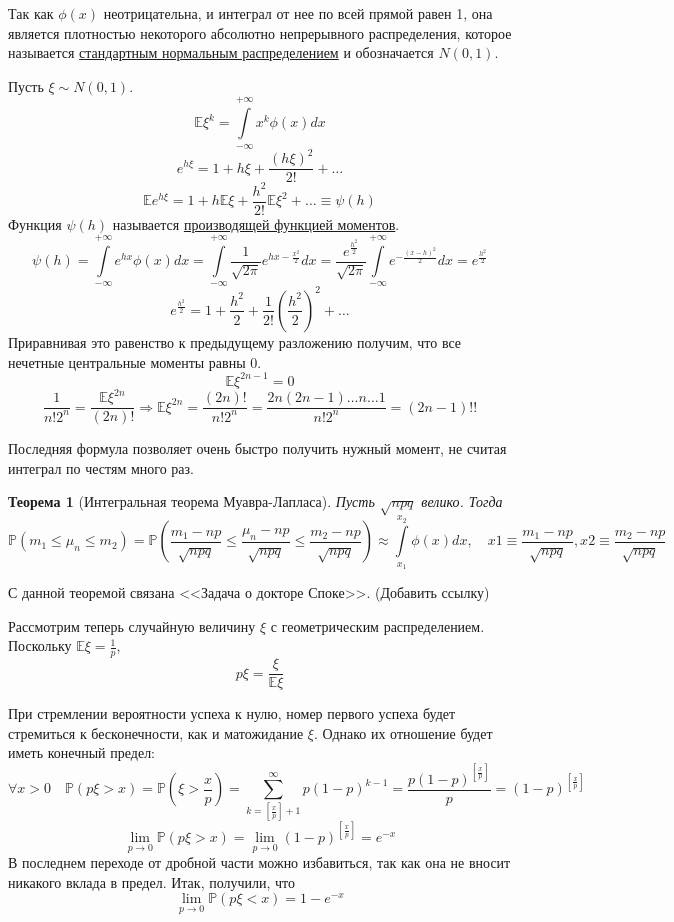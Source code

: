 \documentclass[12pt]{article}
\newtheorem{Th}{Теорема}
\numberwithin{Th}{section}
\numberwithin{Def}{section}
\numberwithin{Lem}{section}
\numberwithin{St}{section}
\numberwithin{equation}{section}
\newcommand\Sum[3]{\sum\limits_{#1 = #2}^{#3}}
\newcommand\Pro{\mathbb{P}} %
\newcommand\Expec{\mathbb{E}} %
\begin{document}
Так как $\phi(x)$ неотрицательна, и интеграл от нее по всей прямой равен 1, она является плотностью некоторого абсолютно непрерывного распределения, которое называется \underline{стандартным нормальным распределением} и обозначается $N(0, 1)$.

Пусть $\xi \sim N(0,1)$.
$$\Expec\xi^k = \int\limits_{-\infty}^{+\infty}x^k\phi(x)dx$$
$$e^{h\xi}=1 + h\xi + \frac{(h\xi)^2}{2!} + \ldots$$
$$\Expec e^{h\xi} = 1 + h\Expec\xi + \frac{h^2}{2!}\Expec\xi^2 + \ldots \equiv \psi(h)$$
Функция $\psi(h)$ называется \underline{производящей функцией моментов}.
$$\psi(h) = \int\limits_{-\infty}^{+\infty}e^{hx}\phi(x)dx = \int\limits_{-\infty}^{+\infty}\frac{1}{\sqrt{2\pi}}e^{hx-\frac{x^2}2}dx = \frac{e^{\frac{h^2}2}}{\sqrt{2\pi}}\int\limits_{-\infty}^{+\infty}e^{-\frac{(x-h)^2}2}dx = e^{\frac{h^2}2}$$
$$e^{\frac{h^2}2} = 1 + \frac{h^2}2 + \frac1{2!}(\frac{h^2}2)^2 + \ldots$$
Приравнивая это равенство к предыдущему разложению получим, что все нечетные центральные моменты равны 0.
$$\Expec\xi^{2n-1} = 0$$
$$\frac{1}{n!2^n} = \frac{\Expec\xi^{2n}}{(2n)!} \Rightarrow \Expec\xi^{2n} = \frac{(2n)!}{n!2^n} = \frac{2n(2n-1)\ldots n \ldots 1}{n!2^n} = (2n-1)!!$$

Последняя формула позволяет очень быстро получить нужный момент, не считая интеграл по честям много раз.

\begin{Th}[Интегральная теорема Муавра-Лапласа]
Пусть $\sqrt{npq}$ велико. Тогда
$$\Pro(m_1 \le \mu_n \le m_2) = \Pro(\frac{m_1 - np}{\sqrt{npq}} \le \frac{\mu_n - np}{\sqrt{npq}} \le \frac{m_2 - np}{\sqrt{npq}}) \approx \int\limits_{x_1}^{x_2}\phi(x)dx, \quad x1 \equiv \frac{m_1 - np}{\sqrt{npq}}, x2 \equiv\frac{m_2 - np}{\sqrt{npq}}$$
\end{Th}

С данной теоремой связана <<Задача о докторе Споке>>. (Добавить ссылку)

Рассмотрим теперь случайную величину $\xi$ с геометрическим распределением. Поскольку $\Expec\xi = \frac1p$, 
$$p\xi=\frac{\xi}{\Expec\xi}$$

При стремлении вероятности успеха к нулю, номер первого успеха будет стремиться к бесконечности, как и матожидание $\xi$. Однако их отношение будет иметь конечный предел:
$$\forall x > 0 \quad \Pro(p\xi > x) = \Pro(\xi > \frac{x}p) = \Sum{k}{[\frac{x}{p}] + 1}{\infty}p(1-p)^{k-1} = \frac{p(1-p)^{[\frac{x}p]}}p = (1-p)^{[\frac{x}p]}$$ 
$$\lim\limits_{p \to 0} \Pro(p\xi > x) = \lim\limits_{p \to 0}(1-p)^{[\frac{x}p]} = e^{-x}$$
В последнем переходе от дробной части можно избавиться, так как она не вносит никакого вклада в предел.
Итак, получили, что
$$\lim\limits_{p \to 0} \Pro(p\xi < x) = 1 - e^{-x}$$
\end{document}

